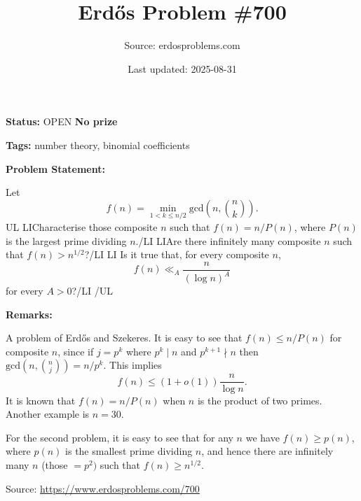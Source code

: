 \documentclass{article}
\title{Erd\H{o}s Problem \#700}
\date{Last updated: 2025-08-31}
\author{Source: erdosproblems.com}
\begin{document}
\maketitle

\noindent\textbf{Status:} OPEN \quad \textbf{No prize}

\noindent\textbf{Tags:} number theory, binomial coefficients

\medskip
\noindent\textbf{Problem Statement:}

Let\[f(n)=\min_{1<k\leq n/2}\textrm{gcd}\left(n,\binom{n}{k}\right).\]{UL}
{LI}Characterise those composite $n$ such that $f(n)=n/P(n)$, where $P(n)$ is the largest prime dividing $n$.{/LI}
{LI}Are there infinitely many composite $n$ such that $f(n)>n^{1/2}$?{/LI}
{LI} Is it true that, for every composite $n$,\[f(n) \ll_A \frac{n}{(\log n)^A}\]for every $A>0$?{/LI}
{/UL}

\bigskip
\noindent\textbf{Remarks:}

A problem of Erd\H{o}s and Szekeres. It is easy to see that $f(n)\leq n/P(n)$ for composite $n$, since if $j=p^k$ where $p^k\mid n$ and $p^{k+1}\nmid n$ then $\textrm{gcd}\left(n,\binom{n}{j}\right)=n/p^k$. This implies\[f(n) \leq (1+o(1))\frac{n}{\log n}.\]It is known that $f(n)=n/P(n)$ when $n$ is the product of two primes. Another example is $n=30$.

For the second problem, it is easy to see that for any $n$ we have $f(n)\geq p(n)$, where $p(n)$ is the smallest prime dividing $n$, and hence there are infinitely many $n$ (those $=p^2)$ such that $f(n)\geq n^{1/2}$.

\bigskip
\noindent\small{Source: \url{https://www.erdosproblems.com/700}}
\end{document}
